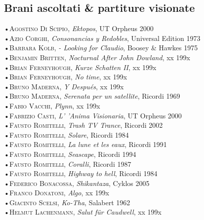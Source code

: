 \documentclass[oneside]{article}
\begin{document}
\begin{multicols*}{2}
\newpage


\section{ Brani ascoltati \& partiture visionate}
•\textsc{\textsf {Agostino Di Scipio}}, \emph{Ektopos}, UT Orpheus 2000\\
•\textsc{\textsf {Azio Corghi}}, \emph{Consonancias y Redobles}, Universal Edition 1973\\
•\textsc{\textsf {Barbara Kolb}}, \emph{ - Looking for Claudio}, Boosey \& Hawkes 1975\\
•\textsc{\textsf {Benjamin Britten}}, \emph{Nocturnal After John Dowland}, xx 199x\\
•\textsc{\textsf {Brian Ferneyhough}}, \emph{Kurze Schatten II}, xx 199x\\
•\textsc{\textsf {Brian Ferneyhough}}, \emph{No time}, xx 199x\\
•\textsc{\textsf {Bruno Maderna}}, \emph{Y Después}, xx 199x\\
•\textsc{\textsf {Bruno Maderna}}, \emph{Serenata per un satellite}, Ricordi 1969\\
•\textsc{\textsf {Fabio Vacchi}}, \emph{Plynn}, xx 199x\\
•\textsc{\textsf {Fabrizio Casti}}, \emph{ L' 'Anima Visionaria}, UT Orpheus 2000\\
•\textsc{\textsf {Fausto Romitelli}}, \emph{Trash TV Trance}, Ricordi 2002\\
•\textsc{\textsf {Fausto Romitelli}}, \emph{Solare}, Ricordi 1984\\
•\textsc{\textsf {Fausto Romitelli}}, \emph{La lune et les eaux}, Ricordi 1991\\
•\textsc{\textsf {Fausto Romitelli}}, \emph{Seascape}, Ricordi 1994\\
•\textsc{\textsf {Fausto Romitelli}}, \emph{Coralli}, Ricordi 1987\\
•\textsc{\textsf {Fausto Romitelli}}, \emph{Highway to hell}, Ricordi 1984\\
•\textsc{\textsf {Federico Bonacossa}}, \emph{Shikantaza}, Cyklos 2005\\
•\textsc{\textsf {Franco Donatoni}}, \emph{Algo}, xx 199x\\
•\textsc{\textsf {Giacinto Scelsi}}, \emph{Ko-Tha}, Salabert 1962\\
•\textsc{\textsf {Helmut Lachenmann}}, \emph{Salut für Caudwell}, xx 199x\\

\end{multicols*}
\end{document}
